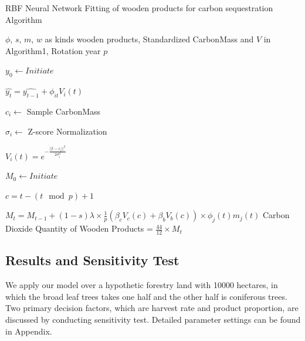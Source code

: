 \documentclass{mcmthesis}
\numberwithin{figure}{section}
\numberwithin{table}{section}
\numberwithin{equation}{section}
\begin{document}
  \begin{algorithm}[htbp]
    \caption{RBF Neural Network Fitting of wooden products for carbon sequestration Algorithm} \label{Product Algo}
    \begin{algorithmic}[1]
        \Require
            $ \phi $, $ s $, $ m $, $ w $ as kinds wooden products, Standardized CarbonMass and $ V $ in Algorithm1,
            Rotation year $ p $ 

                $ y_0 \gets Initiate $ 

                $ \hat{y_t} = \hat{y_{t-1}} + \phi_{it}V_i(t) $
            
                $ c_i\gets $ Sample CarbonMass
            
                $ \sigma_i\gets $ Z-score Normalization

                $ V_i(t) = e^{-\frac{||t-c_i||^2}{2\sigma_i^2}} $
            \EndFor

            $ M_0\gets Initiate $ 

            $ c = t-(t\mod p)+1 $ 



            $ M_t = M_{t-1}+(1-s)\lambda \times \frac{1}{p} (\beta_cV_c(c)+\beta_bV_b(c))\times \phi_j(t)m_j(t)$ 
            \EndFor
        \EndFor
        \Ensure
        Carbon Dioxide Quantity of Wooden Products = $ \frac{44}{12} \times M_t$ 
    \end{algorithmic}
\end{algorithm}

\subsection{Results and Sensitivity Test}

We apply our model over a hypothetic forestry land with 10000 hectares, in which
the broad leaf trees takes one half and the other half is coniferous trees. Two
primary decision factors, which are harvest rate and product proportion,
are discussed by conducting sensitivity test. Detailed parameter settings can
be found in Appendix. 

\end{document}
